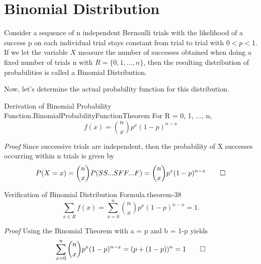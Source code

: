 \documentclass[10pt,]{book}
\makeatletter
\renewcommand*{\proofname}{Proof}
\renewenvironment{proof}[1][\proofname]{\par
  \pushQED{\qed}%
  \normalfont \topsep6\p@\@plus6\p@\relax
  \trivlist
  \item\relax
    {\itshape
    #1\@addpunct{.}}\hspace\labelsep\ignorespaces
}{%
  \popQED\endtrivlist\@endpefalse
}
\numberwithin{equation}{section}
\newcommand{\lt}{<}
\makeatother
\begin{document}
\section[{Binomial Distribution}]{Binomial Distribution}\label{section-46}
\hypertarget{p-896}{}%
Consider a sequence  of n independent Bernoulli trials with the likelihood of a success p on each individual trial stays constant from trial to trial with \(0 \lt p \lt 1 \). If we let the variable \(X\) measure the number of successes obtained when doing a fixed number of trials n with \(R = \{ 0, 1, ..., n \}\), then the resulting distribution of probabilities is called a Binomial Distribution.%
\par
\hypertarget{p-897}{}%
Now, let's determine the actual probability function for this distribution.%
\par
\hypertarget{p-898}{}%
\begin{theorem}{Derivation of Binomial Probability Function.}{}{BinomialProbabilityFunctionTheorem}%
\hypertarget{BinomialProbabilityFunction}{}%
For R = {0, 1, ..., n},%
\begin{equation*}
f(x) = \binom{n}{x}p^x(1-p)^{n-x}
\end{equation*}
%
\end{theorem}
\begin{proof}\hypertarget{proof-40}{}
\hypertarget{p-900}{}%
Since successive trials are independent, then the probability of X successes occurring within n trials is given by%
\begin{equation*}
P(X=x) = \binom{n}{x}P(SS...SFF...F) = 		
\binom{n}{x}p^x(1-p)^{n-x}\qedhere
\end{equation*}
%
\end{proof}
%
\par
\hypertarget{p-901}{}%
\begin{theorem}{Verification of Binomial Distribution Formula.}{}{theorem-38}%
\hypertarget{p-902}{}%
%
\begin{equation*}
\sum_{x \in R} f(x) = \sum_{x=0}^n \binom{n}{x}p^x(1-p)^{n-x} = 1.
\end{equation*}
%
\end{theorem}
\begin{proof}\hypertarget{proof-41}{}
\hypertarget{p-903}{}%
Using the Binomial Theorem with a = p and b = 1-p yields%
\begin{equation*}
\sum_{x=0}^n \binom{n}{x}p^x(1-p)^{n-x} = (p + (1-p))^n = 1\qedhere
\end{equation*}
%
\end{proof}
%
\par
\end{document}
